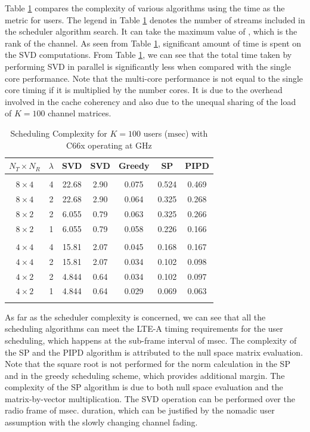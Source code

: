 \documentclass[conference,letterpaper,9pt]{./../IEEEtran}
\begin{document}
Table \ref{table:compexity_comparison} compares the complexity of various algorithms using the time as the metric for  users. The legend \me{\lambda} in Table \ref{table:compexity_comparison} denotes the number of streams included in the scheduler algorithm search. It can take the maximum value of \me{\kappa}, which is the rank of the channel. As seen from Table \ref{table:compexity_comparison}, significant amount of time is spent on the SVD computations. From Table \ref{table:compexity_comparison}, we can see that the total time taken by performing SVD in parallel is significantly less when compared with the single core performance. Note that the multi-core performance is not equal to the single core timing if it is multiplied by the number cores. It is due to the overhead involved in the cache coherency and also due to the unequal sharing of the load of $K = 100$ channel matrices.
\begin{table} \caption{Scheduling Complexity for $K = 100$ users ($\mathrm{msec}$) with C66x operating at GHz} \begin{center} \begin{tabular}{c c c c c c c}
			$N_T \times N_R $ & $\lambda$ & SVD \eqn{(1)} & SVD \eqn{(8)} & Greedy   & SP          & PIPD \\ 
			\hline \\
			$8 \times 4$ & 4 & 22.68 & 2.90 & 0.075 & 0.524 & 0.469 \\ 
			$8 \times 4$ & 2 & 22.68 & 2.90 & 0.064 & 0.325 & 0.268 \\
			$8 \times 2$ & 2 & 6.055 & 0.79 & 0.063 & 0.325 & 0.266 \\
			$8 \times 2$ & 1 & 6.055 & 0.79 & 0.058 & 0.226 & 0.166 \\
			\hline \\
			$4 \times 4$ & 4 & 15.81 & 2.07 & 0.045 & 0.168 & 0.167 \\ 
			$4 \times 4$ & 2 & 15.81 & 2.07 & 0.034 & 0.102 & 0.098 \\
			$4 \times 2$ & 2 & 4.844 & 0.64 & 0.034 & 0.102 & 0.097 \\
			$4 \times 2$ & 1 & 4.844 & 0.64 & 0.029 & 0.069 & 0.063 \\
			\hline \vspace{-0.3in}
		\end{tabular} \label{table:compexity_comparison}\end{center}
\end{table}

As far as the scheduler complexity is concerned, we can see that all the scheduling algorithms can meet the LTE-A timing requirements for the user scheduling, which happens at the sub-frame interval of  msec. The complexity of the SP and the PIPD algorithm is attributed to the null space matrix evaluation. Note that the square root is not performed for the norm calculation in the SP and in the greedy scheduling scheme, which provides additional margin. The complexity of the SP algorithm is due to both null space evaluation and the matrix-by-vector multiplication. The SVD operation can be performed over the radio frame of  msec. duration, which can be justified by the nomadic user assumption with the slowly changing channel fading.
\end{document}
